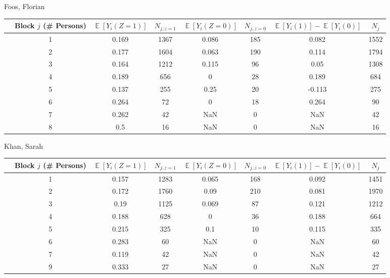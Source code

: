 \documentclass[11pt,notitlepage]{article}
\def\E{\mathop{\mathbb{E}}}
\begin{document}
Foos, Florian


\begin{table}[h!]\small
\begin{center}
\begin{tabular}{rc|cc|cc|cc}
  \hline
 & Block $j$ (\# Persons) & $\E[Y_i(Z=1)]$ & $N_{j, z=1}$ & $\E[Y_i(Z=0)]$ & $N_{j, z=0}$ & $\E[Y_i(1)]-\E[Y_i(0)]$ & $N_j$ \\ 
  \hline
  & 1 & 0.169 & 1367 & 0.086 & 185 & 0.082 & 1552 \\ 
  & 2 & 0.177 & 1604 & 0.063 & 190 & 0.114 & 1794 \\ 
  & 3 & 0.164 & 1212 & 0.115 & 96 & 0.05 & 1308 \\ 
  & 4 & 0.189 & 656 & 0 & 28 & 0.189 & 684 \\ 
  & 5 & 0.137 & 255 & 0.25 & 20 & -0.113 & 275 \\ 
  & 6 & 0.264 & 72 & 0 & 18 & 0.264 & 90 \\ 
  & 7 & 0.262 & 42 & NaN & 0 & NaN & 42 \\ 
  & 8 & 0.5 & 16 & NaN & 0 & NaN & 16 \\ 
   \hline
\end{tabular}
\end{center}
\end{table}


\clearpage

Khan, Sarah


\begin{table}[h!]\small
\begin{center}
\begin{tabular}{rc|cc|cc|cc}
  \hline
 & Block $j$ (\# Persons) & $\E[Y_i(Z=1)]$ & $N_{j, z=1}$ & $\E[Y_i(Z=0)]$ & $N_{j, z=0}$ & $\E[Y_i(1)]-\E[Y_i(0)]$ & $N_j$ \\ 
  \hline
  & 1 & 0.157 & 1283 & 0.065 & 168 & 0.092 & 1451 \\ 
  & 2 & 0.172 & 1760 & 0.09 & 210 & 0.081 & 1970 \\ 
  & 3 & 0.19 & 1125 & 0.069 & 87 & 0.121 & 1212 \\ 
  & 4 & 0.188 & 628 & 0 & 36 & 0.188 & 664 \\ 
  & 5 & 0.215 & 325 & 0.1 & 10 & 0.115 & 335 \\ 
  & 6 & 0.283 & 60 & NaN & 0 & NaN & 60 \\ 
  & 7 & 0.119 & 42 & NaN & 0 & NaN & 42 \\ 
  & 9 & 0.333 & 27 & NaN & 0 & NaN & 27 \\ 
   \hline
\end{tabular}
\end{center}
\end{table}
\end{document}
